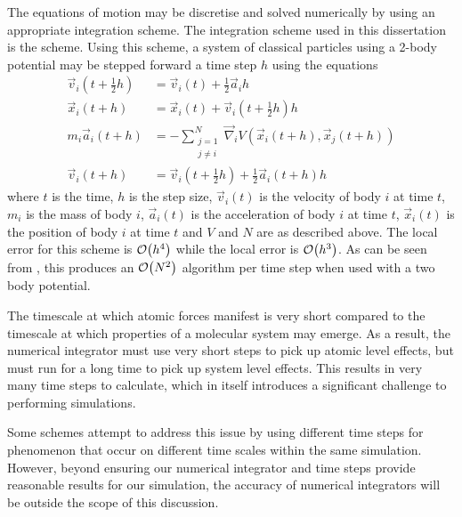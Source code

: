 %
The equations of motion may be discretise and solved numerically
by using an appropriate integration scheme.
%
The integration scheme used in this dissertation is
the \velocityverlet{} scheme.
%
Using this scheme, a system of classical particles using a 2-body potential
may be stepped forward a time step $h$ using the equations
%
\begin{subequations}
\label{eqn:velocity_verlet_scheme}
\begin{align}
    \vec{v}_i(t + \tfrac{1}{2} h) &=
        \vec{v}_i(t) + \tfrac{1}{2}\vec{a}_i h
    \\
    \vec{x}_i(t + h) &=
        \vec{x}_i(t) + \vec{v}_i(t + \tfrac{1}{2} h) h
    \\
    m_i \vec{a}_i(t + h) &=
        - \sum_{\substack{j=1\\j\ne{}i}}^N
            \vec{\nabla}_i V(\vec{x}_i(t+h), \vec{x}_j(t+h))
    \label{eqn:velocity_verlet_force_eval}
    \\
    \vec{v}_i(t+h) &=
        \vec{v}_i(t + \tfrac{1}{2} h) + \tfrac{1}{2} \vec{a}_i(t + h) h
\end  {align}
\end{subequations}
where $t$ is the time,
$h$ is the step size,
$\vec{v}_i(t)$ is the velocity of body $i$ at time $t$,
$m_i$ is the mass of body $i$,
$\vec{a}_i(t)$ is the acceleration of body $i$ at time $t$,
$\vec{x}_i(t)$ is the position of body $i$ at time $t$ and
$V$ and $N$ are as described above.
%
The local error for this scheme is $\mathcal{O}{\left({ h^4 }\right)}$ while the local error
is $\mathcal{O}{\left({ h^3 }\right)}$.
%
As can be seen from
,
this produces an $\mathcal{O}{\left({ N^2 }\right)}$ algorithm per time step when used with a
two body potential.

%
The timescale at which atomic forces manifest is very short compared to
the timescale at which properties of a molecular system may emerge.
%
As a result, the numerical integrator must use very short steps to
pick up atomic level effects, but must run for a long
time to pick up system level effects.
%
This results in very many time steps to calculate, which
in itself introduces a significant challenge to performing simulations.

Some schemes attempt to address this issue by
using different time steps for phenomenon that occur on
different time scales within the same simulation.
%
However, beyond ensuring our numerical integrator and time steps provide
reasonable results for our simulation,
the accuracy of numerical integrators will be
outside the scope of this discussion.


